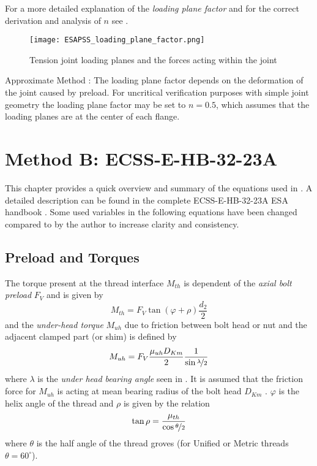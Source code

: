 For a more detailed explanation of the \emph{loading plane factor} and for the correct derivation
and analysis of $n$ see \cite{VDI2230_1,ECSS_HB_32_23A}.
\begin{figure}[!htpb]
  \centering
  \texttt{[image: ESAPSS\_loading\_plane\_factor.png]}
  \caption{Tension joint loading planes and the forces acting within the joint \cite{ESAPSS}}
  \label{fig:esapss_lpf_1}
\end{figure}
\begin{colbox}{Approximate Method \cite{ECSS_HB_32_23A}:}
  The loading plane factor depends on the deformation of the joint caused by preload. For uncritical
  verification purposes with simple joint geometry the loading plane factor may be set to $n=0.5$,
  which assumes that the loading planes are at the center of each flange.
\end{colbox}

\chapter{Method B: ECSS-E-HB-32-23A}
This chapter provides a quick overview and summary of the equations used in \bat. A detailed description
can be found in the complete ECSS-E-HB-32-23A ESA handbook \cite{ECSS_HB_32_23A}. Some used variables
in the following equations have been changed compared to \cite{ECSS_HB_32_23A} by the author to increase
clarity and consistency.

\section{Preload and Torques}
\label{sec:preload}
The torque present at the thread interface $M_{th}$ is dependent of the \emph{axial bolt preload} $F_V$ 
and is given by
\begin{equation}
  M_{th} = F_V \tan(\varphi+\rho)\frac{d_2}{2}
  \label{equ:M_th}
\end{equation}
and the \emph{under-head torque} $M_{uh}$ due to friction between bolt head or nut and the adjacent 
clamped part (or shim) is defined by
\begin{equation}
  M_{uh} = F_V \frac{\mu_{uh} D_{Km}}{2} \frac{1}{\sin{\nicefrac{\lambda}{2}}}
  \label{equ:Muh}
\end{equation}
where $\lambda$ is the \emph{under head bearing angle} seen in .
It is assumed that the friction force for $M_{uh}$ is acting at mean bearing radius of the bolt head 
$D_{Km}$ . $\varphi$ is the helix angle of the thread and $\rho$ is given by the relation
\begin{equation}
  \tan\rho = \frac{\mu_{th}}{\cos\nicefrac{\theta}{2}}
\end{equation}
where $\theta$ is the half angle of the thread groves (for Unified or Metric threads $\theta=60^\circ$).

